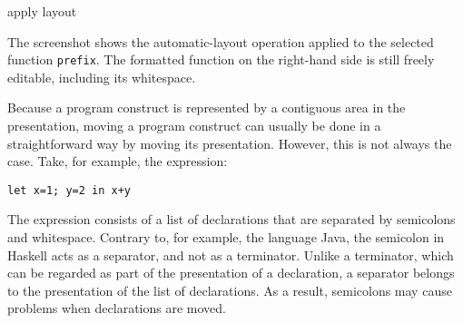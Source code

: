 \documentclass{entcs}
\begin{document}
{
\ttfamily 
{}
\rmfamily
}{\small apply layout}

The screenshot shows the automatic-layout operation applied to the selected function {\tt prefix}. The formatted function on the right-hand side is still freely editable, including its whitespace.


Because a program construct is represented by a contiguous area in the presentation, moving a program construct can usually be done in a straightforward way by moving its presentation. However, this is not always the case. Take, for example, the expression:

\verb|let x=1; y=2 in x+y|

The expression consists of a list of declarations that are separated by semicolons and whitespace. Contrary to, for example, the language Java, the semicolon in Haskell acts as a separator, and not as a terminator. Unlike a terminator, which can be regarded as part of the presentation of a declaration, a separator belongs to the presentation of the list of declarations. As a result, semicolons may cause problems when declarations are moved.
\end{document}
